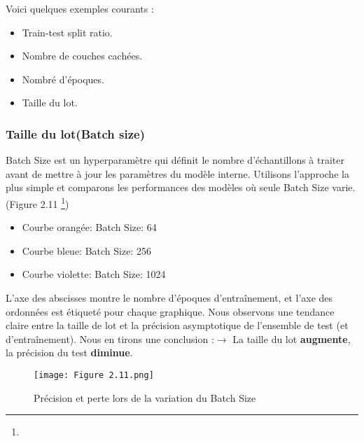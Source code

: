 Voici quelques exemples courants :
\begin{itemize}
    \item Train-test split ratio.
    \item Nombre de couches cachées.
    \item Nombré d'époques.
    \item Taille du lot.
\end{itemize}

\subsubsection{Taille du lot(Batch size)}
Batch Size est un hyperparamètre qui définit le nombre d'échantillons à traiter avant de mettre à jour les paramètres du modèle interne. Utilisons l'approche la plus simple et comparons les performances des modèles où seule Batch Size varie. (Figure 2.11 \footnote{})

\begin{itemize}
    \item Courbe orangée: Batch Size: 64
    \item Courbe bleue: Batch Size: 256
    \item Courbe violette: Batch Size: 1024
\end{itemize}
L'axe des abscisses montre le nombre d'époques d'entraînement, et l'axe des ordonnées est étiqueté pour chaque graphique. Nous observons une tendance claire entre la taille de lot et la précision asymptotique de l'ensemble de test (et d'entraînement). Nous en tirons une conclusion :$\rightarrow$ La taille du lot \textbf{augmente}, la précision du test \textbf{diminue}. 
\clearpage
\begin{figure}[!h]
  \centering
  \texttt{[image: Figure 2.11.png]}
  \caption{Précision et perte lors de la variation du Batch Size  }
  \label{fig:Batch Size}
\end{figure}


